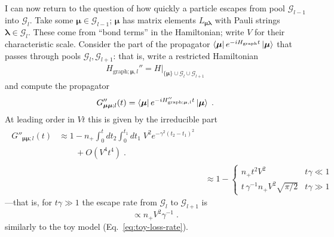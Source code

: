 \documentclass[aps,prb,nofootinbib,twocolumn,balancelastpage,amsmath,amssymb,floatfix,superscriptaddress,]{revtex4-1}
\newcommand{\graph}{\mathrm{graph}}
\newcommand{\pool}{\mathcal G}
\begin{document}
{I can now return to the question of how quickly a particle escapes from pool $\pool_{l-1}$ into $\pool_l$.
Take some $\bm \mu \in \pool_{l-1}$;
$\bm \mu$ has matrix elements $L_{\bm\mu\bm\lambda}$ with Pauli strings $\bm \lambda \in \pool_l$.
These come from ``bond terms'' in the Hamiltonian;
write $V$ for their characteristic scale.
Consider the part of the propagator $\bra {\bm \mu} e^{-iH_\graph t} \ket{\bm \mu}$ that passes through pools $\pool_l, \pool_{l+1}$:
that is, write a restricted Hamiltonian
\begin{align}
  H_{\graph;\bm \mu,l}'' = H|_{\{\bm \mu\} \cup \pool_{l} \cup \pool_{l+1} }
\end{align}
and compute the propagator
\begin{align}
  \label{eq:escape-prop}
  G''_{\bm \mu \bm \mu; l}(t) = \bra {\bm \mu} e^{-iH''_{\graph;\bm \mu,l} t} \ket{\bm \mu}\;.
\end{align}
At leading order in $Vt$ this is given by the irreducible part 
\begin{align}
  \begin{split}
    G''_{\bm \mu \bm \mu; l}(t) 
  &\approx 1 
  - n_+%
  \int_0^t dt_2 \int_0^{t_1} dt_1\; V^2 e^{-\gamma^2(t_2 - t_1)^2}\\
  &\qquad + O(V^4t^4)\;.
\end{split}\\
  \label{eq:esc}
  &\approx 1 - 
  \begin{cases}
    n_+t^2V^2 & t\gamma \ll 1 \\
    t\,\gamma^{-1}  n_+ V^2 \sqrt{\pi/2} & t\gamma \gg 1
    \end{cases}
\end{align}
---that is, for $t\gamma \gg 1$ the escape rate from $\pool_l$ to $\pool_{l+1}$ is
\begin{equation}
  \label{eq:esc-est}
  \propto n_+V^2 \gamma^{-1}\;.
\end{equation}
similarly to the toy model (Eq.~\eqref{eq:toy-loss-rate}).



}
\end{document}
